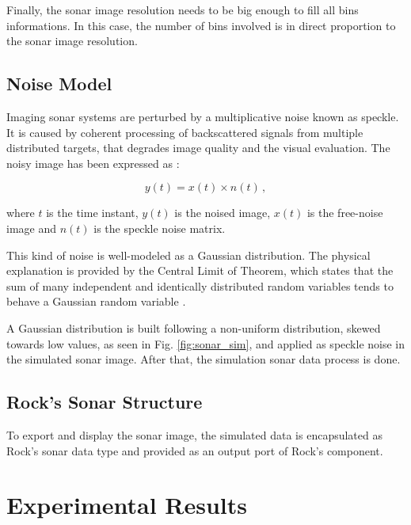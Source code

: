 \documentclass[final,5p,times]{elsarticle}
\begin{document}
Finally, the sonar image resolution needs to be big enough to fill all bins informations. In this case, the number of bins involved is in direct proportion to the sonar image resolution.


\subsection{Noise Model}
\label{dev:noise}

Imaging sonar systems are perturbed by a multiplicative noise known as speckle. It is caused by coherent processing of backscattered signals from multiple distributed targets, that degrades image quality and the visual evaluation. The noisy image has been expressed as \cite{lee1980}:

\begin{equation}
\label{eq:2}
y(t) = x(t) \times n(t) \, ,
\end{equation}

where $t$ is the time instant, $y(t)$ is the noised image, $x(t)$ is the free-noise image and $n(t)$ is the speckle noise matrix.

This kind of noise is well-modeled as a Gaussian distribution. The physical explanation is provided by the Central Limit of Theorem, which states that the sum of many independent and identically distributed random variables tends to behave a Gaussian random variable \cite{papoulis2002}.

A Gaussian distribution is built following a non-uniform distribution, skewed towards low values, as seen in Fig. \ref{fig:sonar_sim}, and applied as speckle noise in the simulated sonar image. After that, the simulation sonar data process is done.

\subsection{Rock's Sonar Structure}
\label{dev:rock}

To export and display the sonar image, the simulated data is encapsulated as Rock's sonar data type and provided as an output port of Rock's component.


\section{Experimental Results}
\label{results}
\end{document}
